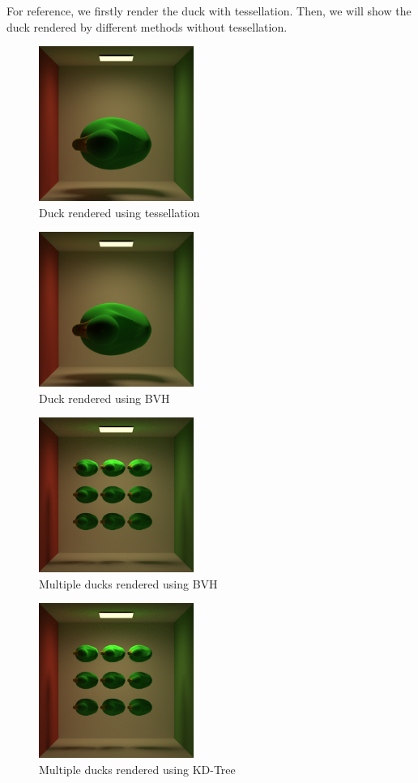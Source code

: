 \documentclass[acmtog]{acmart}
\begin{document}
For reference, we firstly render the duck with tessellation. Then, we will show the duck rendered by different methods without tessellation.
\begin{figure}[htbp]
    \centering
    \includegraphics[width=0.45\textwidth]{../results/result_mesh_1080_1024.png}
    \caption{Duck rendered using tessellation}
\end{figure}
\begin{figure}[htbp]
    \centering
    \includegraphics[width=0.45\textwidth]{../results/result_bvh_1080_1024.png}
    \caption{Duck rendered using BVH}
\end{figure}
\begin{figure}[htbp]
    \centering
    \includegraphics[width=0.45\textwidth]{../results/result_3x3_bvh.png}
    \caption{Multiple ducks rendered using BVH}
\end{figure}
\begin{figure}[htbp]
    \centering
    \includegraphics[width=0.45\textwidth]{../results/result_3x3_kdtree.png}
    \caption{Multiple ducks rendered using KD-Tree}
\end{figure}
\end{document}
